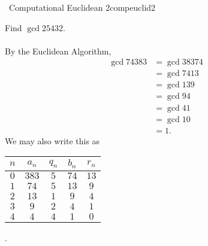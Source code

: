     \begin{exercise}{\Difficulty\,\Difficulty\,\,Computational Euclidean 2}{compeuclid2}
    
        Find \(\gcd{254}{32}\).
        \\
        \\
        By the Euclidean Algorithm,
        \begin{align*}
            \gcd{74}{383}&=\gcd{383}{74} \\
            &=\gcd{74}{13} \\
            &=\gcd{13}{9} \\
            &=\gcd{9}{4} \\
            &=\gcd{4}{1} \\
            &=\gcd{1}{0} \\
            &=1.
        \end{align*}
        We may also write this as
        \begin{center}
            \begin{tabular}{c|c|c|c|c}
                \hline
                \(n\) & \(a_n\) & \(q_n\) & \(b_n\) & \(r_n\) \\
                \hline
                \(0\) & \(383\) & \(5\) & \(74\) & \(13\) \\
                \(1\) & \(74\) & \(5\) & \(13\) & \(9\) \\
                \(2\) & \(13\) & \(1\) & \(9\) & \(4\) \\
                \(3\) & \(9\) & \(2\) & \(4\) & \(1\) \\
                \(4\) & \(4\) & \(4\) & \(1\) & \(0\) \\
                \hline
            \end{tabular}.
        \end{center}
    
    \end{exercise}
